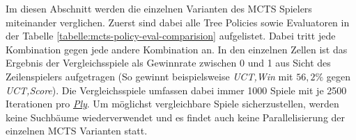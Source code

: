 Im diesen Abschnitt werden die einzelnen Varianten des \ac{MCTS} Spielers miteinander verglichen. Zuerst sind dabei alle Tree Policies sowie Evaluatoren in der Tabelle \ref{tabelle:mcts-policy-eval-comparision} aufgelistet. Dabei tritt jede Kombination gegen jede andere Kombination an. In den einzelnen Zellen ist das Ergebnis der Vergleichsspiele als Gewinnrate zwischen 0 und 1 aus Sicht des Zeilenspielers aufgetragen (So gewinnt beispielsweise \emph{\acs{UCT},Win} mit $56{,}2\%$ gegen \emph{\acs{UCT},Score}). Die Vergleichsspiele umfassen dabei immer 1000 Spiele mit je 2500 Iterationen pro \hyperref[text:ply]{\emph{Ply}}. Um möglichst vergleichbare Spiele sicherzustellen, werden keine Suchbäume wiederverwendet und es findet auch keine Parallelisierung der einzelnen \ac{MCTS} Varianten statt.

\begin{table}[H]
    \centering
\end{table}
